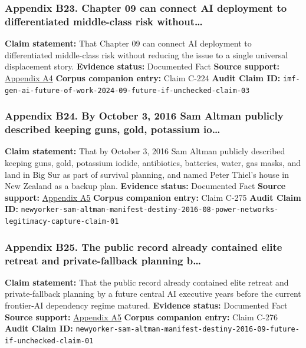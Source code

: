 \documentclass[
  american,
  11pt,
  letterpaper,
]{article}
\begin{document}
\subsubsection{Appendix B23. Chapter 09 can connect AI deployment to
differentiated middle-class risk
without\ldots{}}\label{appendix-b23-chapter-09-can-connect-ai-deployment-to-differentiated-middle-class-risk-without}

\textbf{Claim statement:} That Chapter 09 can connect AI deployment to
differentiated middle-class risk without reducing the issue to a single
universal displacement story. \textbf{Evidence status:} Documented Fact
\textbf{Source support:}
\hyperref[appendix-a4-gen-ai-artificial-intelligence-and-the-future-of-work]{Appendix
A4} \textbf{Corpus companion entry:} Claim C-224 \textbf{Audit Claim
ID:}
\texttt{imf-gen-ai-future-of-work-2024-09-future-if-unchecked-claim-03}

\subsubsection{Appendix B24. By October 3, 2016 Sam Altman publicly
described keeping guns, gold, potassium
io\ldots{}}\label{appendix-b24-by-october-3-2016-sam-altman-publicly-described-keeping-guns-gold-potassium-io}

\textbf{Claim statement:} That by October 3, 2016 Sam Altman publicly
described keeping guns, gold, potassium iodide, antibiotics, batteries,
water, gas masks, and land in Big Sur as part of survival planning, and
named Peter Thiel's house in New Zealand as a backup plan.
\textbf{Evidence status:} Documented Fact \textbf{Source support:}
\hyperref[appendix-a5-sam-altman-s-manifest-destiny]{Appendix A5}
\textbf{Corpus companion entry:} Claim C-275 \textbf{Audit Claim ID:}
\texttt{newyorker-sam-altman-manifest-destiny-2016-08-power-networks-legitimacy-capture-claim-01}

\subsubsection{Appendix B25. The public record already contained elite
retreat and private-fallback planning
b\ldots{}}\label{appendix-b25-the-public-record-already-contained-elite-retreat-and-private-fallback-planning-b}

\textbf{Claim statement:} That the public record already contained elite
retreat and private-fallback planning by a future central AI executive
years before the current frontier-AI dependency regime matured.
\textbf{Evidence status:} Documented Fact \textbf{Source support:}
\hyperref[appendix-a5-sam-altman-s-manifest-destiny]{Appendix A5}
\textbf{Corpus companion entry:} Claim C-276 \textbf{Audit Claim ID:}
\texttt{newyorker-sam-altman-manifest-destiny-2016-09-future-if-unchecked-claim-01}
\end{document}
